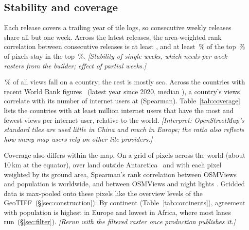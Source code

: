\documentclass[10pt,twocolumn]{article}
\newcommand{\todo}[1]{{\color{red!60!black}\itshape[#1]}}
\begin{document}
\subsection{Stability and coverage}\label{sec:coverage}
Each release covers a trailing year of tile logs, so consecutive weekly
releases share all but one week. Across the \resStabilityReleases{} latest
releases, the area-weighted rank correlation between consecutive releases is
at least \resStabilitySpearmanMin{}, and at least
\resStabilityTopKeptPctMin\,\% of the top \resStabilityTopPct\,\% of pixels
stay in the top \resStabilityTopPct\,\%.
\todo{Stability of single weeks, which needs per-week rasters from the
builder; effect of partial weeks.}

\resCoverageInCountriesPct\,\% of all views fall on a country; the rest is
mostly sea. Across the \resCoverageCountries{} countries with recent World
Bank figures~\cite{wdi} (latest year since 2020, median
\resCoverageMedianYear{}), a country's views correlate with its number of
internet users at \resCoverageSpearman{} (Spearman).
Table~\ref{tab:coverage} lists the countries with at least
\resCoverageMinUsersMillions{} million internet users that have the most and
fewest views per internet user, relative to the world.
\todo{Interpret: OpenStreetMap's standard tiles are used little in China and
much in Europe; the ratio also reflects how many map users rely on other
tile providers.}

\begin{table}[t]
  \centering\small
  \caption{Share of views divided by share of internet users, for countries
    with the highest and lowest ratio.}
  \label{tab:coverage}
  
\end{table}

Coverage also differs within the map. On a grid of \resExternalLevel{}
pixels across the world (about 10\,km at the equator), over land outside
Antarctica~\cite{naturalearth} and with each pixel weighted by its ground
area, Spearman's rank correlation between OSMViews and population is
\resExternalGhsl{} worldwide, and between OSMViews and night lights
\resExternalViirs. Gridded data is max-pooled onto these pixels like the
overview levels of the GeoTIFF~(\S\ref{sec:construction}). By continent
(Table~\ref{tab:continents}), agreement with population is highest in
Europe and lowest in Africa, where most lanes run~(\S\ref{sec:filter}).
\todo{Rerun with the filtered raster once production publishes it.}

\begin{table}[t]
  \centering\small
  \caption{Spearman's rank correlation of OSMViews with population (GHS-POP),
    night lights (VIIRS) and photo locations (Wikimedia Commons) on 10\,km
    pixels, by continent.}
  \label{tab:continents}
  
\end{table}
\end{document}
